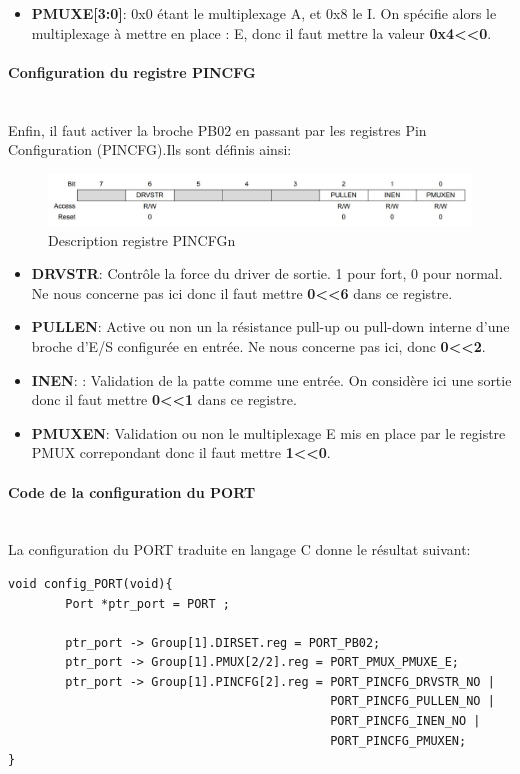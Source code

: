 \documentclass[a4paper]{article}
\begin{document}
	\begin{itemize}
		\item {\bf PMUXE[3:0]}: 0x0 étant le multiplexage A, et 0x8 le I. On spécifie alors le multiplexage à mettre en place : E, donc il faut mettre la valeur {\bf 0x4\textless\textless0}.
	\end{itemize}
	\newpage
	\paragraph{Configuration du registre PINCFG} 
	~~\\
	Enfin, il faut activer la broche PB02 en passant par les registres Pin Configuration (PINCFG).Ils sont définis ainsi:   
	\begin{figure}[H]
		\centering
		\includegraphics[width=0.9\linewidth]{PINCFGn.jpg}
		\caption{Description registre PINCFGn}
	\end{figure}
	
	\begin{itemize}
		\item {\bf DRVSTR}: Contrôle la force du driver de sortie. 1 pour fort, 0 pour normal. Ne nous concerne pas ici donc il faut mettre {\bf 0\textless\textless6} dans ce registre.~~\\
		\item {\bf PULLEN}: Active ou non un la résistance pull-up ou pull-down interne d'une broche d'E/S configurée en entrée. Ne nous concerne pas ici, donc {\bf 0\textless\textless2}.~~\\
		\item {\bf INEN}: : Validation de la patte comme une entrée. On considère ici une sortie donc il faut mettre {\bf 0\textless\textless1} dans ce registre.~~\\
		\item {\bf PMUXEN}: Validation ou non le multiplexage E mis en place par le registre PMUX correpondant donc il faut mettre {\bf 1\textless\textless0}.~~\\
	\end{itemize}

	
	\paragraph{Code de la configuration du PORT} ~~\\
	La configuration du PORT traduite en langage C donne le résultat suivant:
	\begin{lstlisting}[style=CStyle]
void config_PORT(void){
	    Port *ptr_port = PORT ;
	
	    ptr_port -> Group[1].DIRSET.reg = PORT_PB02; 
	    ptr_port -> Group[1].PMUX[2/2].reg = PORT_PMUX_PMUXE_E;
	    ptr_port -> Group[1].PINCFG[2].reg = PORT_PINCFG_DRVSTR_NO |
	                                         PORT_PINCFG_PULLEN_NO |
	                                         PORT_PINCFG_INEN_NO |
	                                         PORT_PINCFG_PMUXEN;
}
	\end{lstlisting}
	
\end{document}
